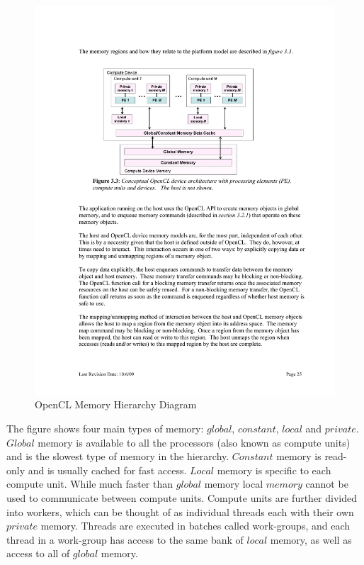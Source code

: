 \begin{figure}[!htc]
 		\centering
		\includegraphics[scale=1.0]{figures/gpu_memory.pdf}
        \caption{ OpenCL Memory Hierarchy Diagram \cite{OpenCLSpec} }
        \label{fig:gpu_memory}
\end{figure}

The figure shows four main types of memory: $global$, $constant$, $local$ and
$private$. $Global$ memory is available to all the processors (also known as
compute units) and is the slowest type of memory in the hierarchy.  $Constant$
memory is read-only and is usually cached for fast access. $Local$ memory is
specific to each compute unit. While much faster than $global$ memory local
$memory$ cannot be used to communicate between compute units. Compute units are
further divided into workers, which can be thought of as individual threads
each with their own $private$ memory. Threads are executed in batches called
work-groups, and each thread in a work-group has access to the same bank of
$local$ memory, as well as access to all of $global$ memory. 


